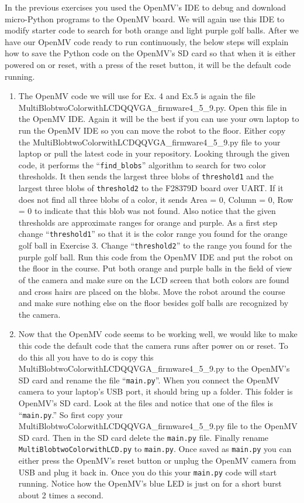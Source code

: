 \documentclass[11pt]{article}
\begin{document}
In the previous exercises you used the OpenMV’s IDE to debug and download micro-Python programs to the OpenMV board. We will again use this IDE to modify starter code to search for both orange and light purple golf balls. After we have our OpenMV code ready to run continuously, the below steps will explain how to save the Python code on the OpenMV’s SD card so that when it is either powered on or reset, with a press of the reset button, it will be the default code running.
%
\begin{enumerate}
        \item The OpenMV code we will use for Ex. 4 and Ex.5 is again the file MultiBlobtwoColorwithLCDQQVGA\_firmware4\_5\_9.py. Open this file in the OpenMV IDE. Again it will be the best if you can use your own laptop to run the OpenMV IDE so you can move the robot to the floor. Either copy the MultiBlobtwoColorwithLCDQQVGA\_firmware4\_5\_9.py file to your laptop or pull the latest code in your repository. Looking through the given code, it performs the “\texttt{find_blobs}” algorithm to search for two color thresholds. It then sends the largest three blobs of \texttt{threshold1} and the largest three blobs of \texttt{threshold2} to the F28379D board over UART. If it does not find all three blobs of a color, it sends Area = 0, Column = 0, Row = 0 to indicate that this blob was not found. Also notice that the given thresholds are approximate ranges for orange and purple. As a first step change “\texttt{threshold1}” so that it is the color range you found for the orange golf ball in Exercise 3. Change “\texttt{threshold2}” to the range you found for the purple golf ball. Run this code from the OpenMV IDE and put the robot on the floor in the course. Put both orange and purple balls in the field of view of the camera and make sure on the LCD screen that both colors are found and cross hairs are placed on the blobs. Move the robot around the course and make sure nothing else on the floor besides golf balls are recognized by the camera.
    \item Now that the OpenMV code seems to be working well, we would like to make this code the default code that the camera runs after power on or reset. To do this all you have to do is copy this MultiBlobtwoColorwithLCDQQVGA\_firmware4\_5\_9.py to the OpenMV’s SD card and rename the file “\texttt{main.py}”. When you connect the OpenMV camera to your laptop’s USB port, it should bring up a folder. This folder is OpenMV’s SD card. Look at the files and notice that one of the files is “\texttt{main.py}.” So first copy your MultiBlobtwoColorwithLCDQQVGA\_firmware4\_5\_9.py file to the OpenMV SD card. Then in the SD card delete the \texttt{main.py} file. Finally rename \texttt{MultiBlobtwoColorwithLCD.py} to \texttt{main.py}. Once saved as \texttt{main.py} you can either press the OpenMV’s reset button or unplug the OpenMV camera from USB and plug it back in. Once you do this your \texttt{main.py} code will start running. Notice how the OpenMV’s blue LED is just on for a short burst about 2 times a second.

\end{enumerate}
\end{document}
